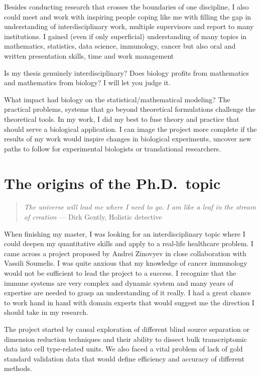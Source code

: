 \documentclass[12pt,]{book}
\theoremstyle{definition}
\theoremstyle{definition}
\theoremstyle{definition}
\theoremstyle{remark}
\begin{document}
Besides conducting research that crosses the boundaries of one
discipline, I also could meet and work with inspiring people coping like
me with filling the gap in understanding of interdisciplinary work,
multiple supervisors and report to many institutions. I gained (even if
only superficial) understanding of many topics in mathematics,
statistics, data science, immunology, cancer but also oral and written
presentation skills, time and work management

Is my thesis genuinely interdisciplinary? Does biology profits from
mathematics and mathematics from biology? I will let you judge it.

What impact had biology on the statistical/mathematical modeling? The
practical problems, systems that go beyond theoretical formulations
challenge the theoretical tools. In my work, I did my best to fuse
theory and practice that should serve a biological application. I can
image the project more complete if the results of my work would inspire
changes in biological experiments, uncover new paths to follow for
experimental biologists or translational researchers.

\hypertarget{the-origins-of-the-ph.d.topic}{%
\section*{The origins of the
Ph.D.~topic}\label{the-origins-of-the-ph.d.topic}}

\begin{quote}
\emph{The universe will lead me where I need to go. I am like a leaf in
the stream of creation} --- Dirk Gently, Holistic detective
\end{quote}

When finishing my master, I was looking for an interdisciplinary topic
where I could deepen my quantitative skills and apply to a real-life
healthcare problem. I came across a project proposed by Andrei Zinovyev
in close collaboration with Vassili Soumelis. I was quite anxious that
my knowledge of cancer immunology would not be sufficient to lead the
project to a success. I recognize that the immune systems are very
complex and dynamic system and many years of expertise are needed to
grasp an understanding of it really. I had a great chance to work hand
in hand with domain experts that would suggest me the direction I should
take in my research.

The project started by causal exploration of different blind source
separation or dimension reduction techniques and their ability to
dissect bulk transcriptomic data into cell type-related units. We also
faced a vital problem of lack of gold standard validation data that
would define efficiency and accuracy of different methods.
\end{document}
